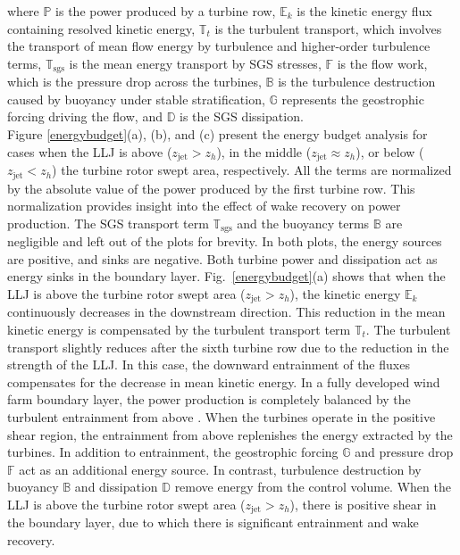 \documentclass[%
 aip,
 amsmath,amssymb,
reprint,
twocolumn,%
author-numerical,%
]{revtex4-1}
\begin{document}
{{\noindent where $\mathbb{P}$ is the power produced by a turbine row, $\mathbb{E}_k$ is the kinetic energy flux containing resolved kinetic energy, $\mathbb{T}_t$ is the turbulent transport, which involves the transport of mean flow energy by turbulence \cite{lum72} and higher-order turbulence terms, $\mathbb{T}_\text{sgs}$ is the mean energy transport by SGS stresses, $\mathbb{F}$ is the flow work, which is the pressure drop across the turbines, $\mathbb{B}$ is the turbulence destruction caused by buoyancy under stable stratification, $\mathbb{G}$ represents the geostrophic forcing driving the flow, and $\mathbb{D}$ is the SGS dissipation.\\
\indent Figure \ref{energybudget}(a), (b), and (c) present the energy budget analysis for cases when the LLJ is above ($z_\text{jet} > z_h$), in the middle ($z_\text{jet}\approx z_h$), or below ($ z_\text{jet} < z_h$) the turbine rotor swept area, respectively. All the terms are normalized by the absolute value of the power produced by the first turbine row. This normalization provides insight into the effect of wake recovery on power production. {\color{black} The SGS transport term $\mathbb{T}_\text{sgs}$ and the buoyancy terms $\mathbb{B}$ are negligible and left out of the plots for brevity.} In both plots, the energy sources are positive, and sinks are negative. Both turbine power and dissipation act as energy sinks in the boundary layer. Fig.\ \ref{energybudget}(a) shows that when the LLJ is above the turbine rotor swept area ($z_\text{jet} > z_h$), the kinetic energy $\mathbb{E}_k$ continuously decreases in the downstream direction. This reduction in the mean kinetic energy is compensated by the turbulent transport term $\mathbb{T}_t$. The turbulent transport slightly reduces after the sixth turbine row due to the reduction in the strength of the LLJ. In this case, the downward entrainment of the fluxes compensates for the decrease in mean kinetic energy. In a fully developed wind farm boundary layer, the power production is completely balanced by the turbulent entrainment from above \cite{cal10, cal10b}. When the turbines operate in the positive shear region, the entrainment from above replenishes the energy extracted by the turbines. In addition to entrainment, the geostrophic forcing $\mathbb{G}$ and pressure drop $\mathbb{F}$ act as an additional energy source. In contrast, turbulence destruction by buoyancy $\mathbb{B}$ and dissipation $\mathbb{D}$ remove energy from the control volume. {\color{black} When the LLJ is above the turbine rotor swept area ($z_\text{jet} > z_h$),} there is positive shear in the boundary layer, due to which there is significant entrainment and wake recovery.\\
}}
\end{document}
